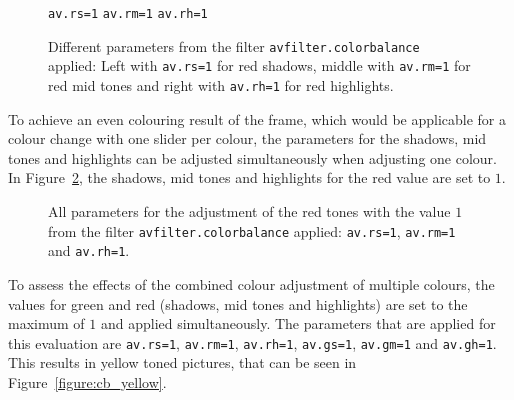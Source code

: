 \documentclass[../MasterThesis.tex]{subfiles}
\begin{document}
\begin{figure}[H]
	\begin{center}
		\small{
		\texttt{av.rs=1} \hspace*{0.22\textwidth} \texttt{av.rm=1} \hspace*{0.23\textwidth} \texttt{av.rh=1}}
		\caption[Different parameters from the filter \texttt{avfilter.colorbalance} applied.]{Different parameters from the filter \texttt{avfilter.colorbalance} applied: Left with \texttt{av.rs=1} for red shadows, middle with \texttt{av.rm=1} for red mid tones and right with \texttt{av.rh=1} for red highlights.}
			\label{figure:rs1rm1rh1}
	\end{center}
\end{figure}

To achieve an even colouring result of the frame, which would be applicable for a colour change with one slider per colour, the parameters for the shadows, mid tones and highlights can be adjusted simultaneously when adjusting one colour. In Figure~\ref{figure:rsrmrh1}, the shadows, mid tones and highlights for the red value are set to $1$. 

\begin{figure}[H]
	\begin{center}
		\caption[Parameters set to $1$ for red using the \texttt{avfilter.colorbalance} filter.]{All parameters for the adjustment of the red tones with the value $1$ from the filter \texttt{avfilter.colorbalance} applied: \texttt{av.rs=1}, \texttt{av.rm=1} and \texttt{av.rh=1}.}
		\label{figure:rsrmrh1}
	\end{center}
\end{figure}

To assess the effects of the combined colour adjustment of multiple colours, the values for green and red (shadows, mid tones and highlights) are set to the maximum of $1$ and applied simultaneously. The parameters that are applied for this evaluation are \texttt{av.rs=1}, \texttt{av.rm=1}, \texttt{av.rh=1}, \texttt{av.gs=1}, \texttt{av.gm=1} and \texttt{av.gh=1}.
This results in yellow toned pictures, that can be seen in Figure~\ref{figure:cb_yellow}.
\end{document}
